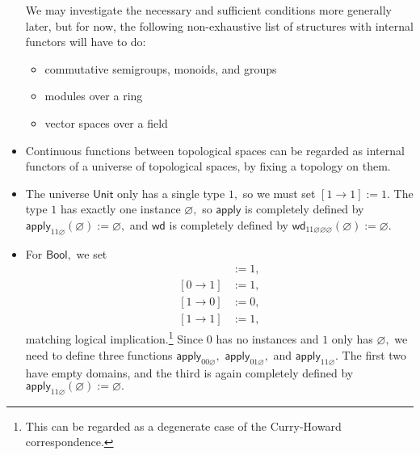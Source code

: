 \documentclass[a4paper]{article}
\theoremstyle{definition}
\theoremstyle{remark}
\renewcommand{\emptyset}{\varnothing}
\newcommand{\nm}{\mathsf}
\newcommand{\universe}{\nm}
\newcommand{\Unit}{\universe{Unit}}
\newcommand{\Bool}{\universe{Bool}}
\newcommand{\apply}{\nm{apply}}
\newcommand{\congrArg}{\nm{wd}}
\begin{document}
\begin{itemize}
  We may investigate the necessary and sufficient conditions more generally later, but for
  now, the following non-exhaustive list of structures with internal functors will have to
  do:
  \begin{itemize}
    \item commutative semigroups, monoids, and groups
    \item modules over a ring
    \item vector spaces over a field
  \end{itemize}
  \item Continuous functions between topological spaces can be regarded as internal
  functors of a universe of topological spaces, by fixing a topology on them.
  \item The universe $\Unit$ only has a single type $1,$ so we must set $[1 \to 1] := 1.$
  The type $1$ has exactly one instance $\emptyset,$ so $\apply$ is completely
  defined by $\apply_{11\emptyset}(\emptyset) := \emptyset,$ and $\congrArg$ is completely
  defined by $\congrArg_{11\emptyset\emptyset\emptyset}(\emptyset) := \emptyset.$
  \item For $\Bool,$ we set
  \begin{align*}
    [0 \to 0] &:= 1,\\
    [0 \to 1] &:= 1,\\
    [1 \to 0] &:= 0,\\
    [1 \to 1] &:= 1,
  \end{align*}
  matching logical implication.\footnote{This can be regarded as a degenerate case of
  the Curry-Howard correspondence.} Since $0$ has no instances and $1$ only has
  $\emptyset,$ we need to define three functions $\apply_{00\emptyset},$
  $\apply_{01\emptyset},$ and $\apply_{11\emptyset}.$ The first two have empty domains,
  and the third is again completely defined by
  $\apply_{11\emptyset}(\emptyset) := \emptyset.$
\end{itemize}
\end{document}
